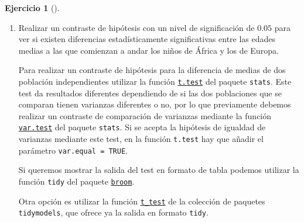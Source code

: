 \documentclass[
  a4paper,
]{scrreport}
\theoremstyle{definition}
\newtheorem{exercise}{Ejercicio}[chapter]
\theoremstyle{remark}
\begin{document}
\begin{exercise}[]
\begin{enumerate}
\begin{tcolorbox}
  \end{tcolorbox}
\item
  Realizar un contraste de hipótesis con un nivel de significación de
  \(0.05\) para ver si existen diferencias estadísticamente
  significativas entre las edades medias a las que comienzan a andar los
  niños de África y los de Europa.

  \begin{tcolorbox}[enhanced jigsaw, colframe=quarto-callout-note-color-frame, toprule=.15mm, bottomtitle=1mm, breakable, opacitybacktitle=0.6, toptitle=1mm, colback=white, bottomrule=.15mm, title=\textcolor{quarto-callout-note-color}{\faInfo}\hspace{0.5em}{Ayuda}, arc=.35mm, left=2mm, titlerule=0mm, rightrule=.15mm, coltitle=black, leftrule=.75mm, opacityback=0, colbacktitle=quarto-callout-note-color!10!white]

  Para realizar un contraste de hipótesis para la diferencia de medias
  de dos población independientes utilizar la función
  \href{https://www.rdocumentation.org/packages/stats/versions/3.6.2/topics/t.test}{\texttt{t.test}}
  del paquete \texttt{stats}. Este test da resultados diferentes
  dependiendo de si las dos poblaciones que se comparan tienen varianzas
  diferentes o no, por lo que previamente debemos realizar un contraste
  de comparación de varianzas mediante la función
  \href{https://www.rdocumentation.org/packages/stats/versions/3.6.2/topics/var.test}{\texttt{var.test}}
  del paquete \texttt{stats}. Si se acepta la hipótesis de igualdad de
  varianzas mediante este test, en la función \texttt{t.test} hay que
  añadir el parámetro \texttt{var.equal\ =\ TRUE}.

  Si queremos mostrar la salida del test en formato de tabla podemos
  utilizar la función \texttt{tidy} del paquete
  \href{https://broom.tidymodels.org/index.html}{\texttt{broom}}.

  Otra opción es utilizar la función
  \href{https://infer.tidymodels.org/reference/t_test.html}{\texttt{t\_test}}
  de la colección de paquetes \texttt{tidymodels}, que ofrece ya la
  salida en formato \texttt{tidy}.

  \end{tcolorbox}

  \begin{tcolorbox}[enhanced jigsaw, colframe=quarto-callout-tip-color-frame, toprule=.15mm, bottomtitle=1mm, breakable, opacitybacktitle=0.6, toptitle=1mm, colback=white, bottomrule=.15mm, title=\textcolor{quarto-callout-tip-color}{\faLightbulb}\hspace{0.5em}{Solución}, arc=.35mm, left=2mm, titlerule=0mm, rightrule=.15mm, coltitle=black, leftrule=.75mm, opacityback=0, colbacktitle=quarto-callout-tip-color!10!white]


\end{tcolorbox}
\end{enumerate}
\end{exercise}
\end{document}
